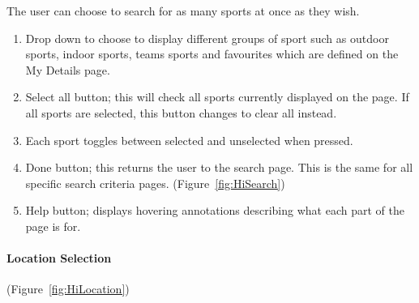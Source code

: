 
The user can choose to search for as many sports at once as they wish.
\begin{enumerate}
	\item Drop down to choose to display different groups of sport such as
		outdoor sports, indoor sports, teams sports and favourites which are
		defined on the My Details page.
	\item Select all button; this will check all sports currently displayed on
		the page. If all sports are selected, this button changes to clear all
		instead.
	\item Each sport toggles between selected and unselected when pressed.
	\item Done button; this returns the user to the search page. This is the
		same for all specific search criteria pages.
		(Figure~\ref{fig:HiSearch})
	\item Help button; displays hovering annotations describing what each part
		of the page is for.
\end{enumerate}

\paragraph{Location Selection} (Figure~\ref{fig:HiLocation})


